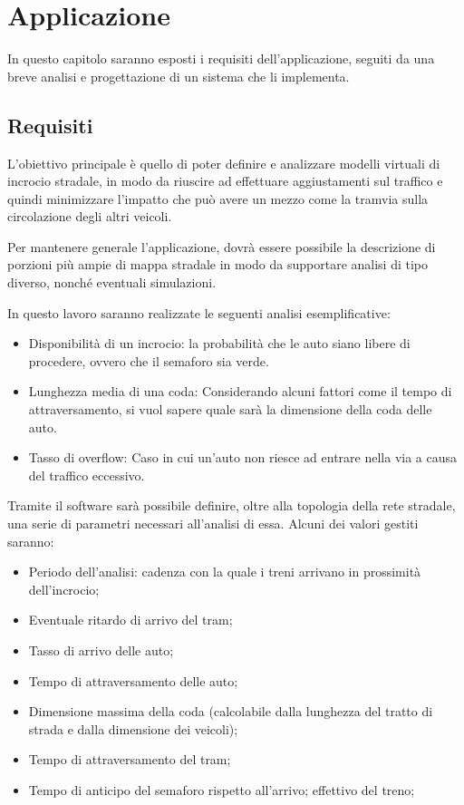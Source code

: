 \chapter{Applicazione}

In questo capitolo saranno esposti i requisiti dell'applicazione, seguiti da una breve analisi e progettazione di un sistema che li implementa.

\section{Requisiti}
L'obiettivo principale è quello di poter definire e analizzare modelli virtuali di incrocio stradale, in modo da riuscire ad effettuare aggiustamenti sul traffico e quindi minimizzare l'impatto che può avere un mezzo come la tramvia sulla circolazione degli altri veicoli.

Per mantenere generale l'applicazione, dovrà essere possibile la descrizione di porzioni più ampie di mappa stradale in modo da supportare analisi di tipo diverso, nonché eventuali simulazioni.

In questo lavoro saranno realizzate le seguenti analisi esemplificative:
\begin{itemize}
	\item Disponibilità di un incrocio: la probabilità che le auto siano libere di procedere, ovvero che il semaforo sia verde.
	\item Lunghezza media di una coda: Considerando alcuni fattori come il tempo di attraversamento, si vuol sapere quale sarà la dimensione della coda delle auto.
	\item Tasso di overflow: Caso in cui un'auto non riesce ad entrare nella via a causa del traffico eccessivo.
\end{itemize}

Tramite il software sarà possibile definire, oltre alla topologia della rete stradale, una serie di parametri necessari all'analisi di essa.
Alcuni dei valori gestiti saranno:
\begin{itemize}
	\item Periodo dell'analisi: cadenza con la quale i treni arrivano in prossimità dell'incrocio;
	\item Eventuale ritardo di arrivo del tram;
	\item Tasso di arrivo delle auto;
	\item Tempo di attraversamento delle auto;
	\item Dimensione massima della coda (calcolabile dalla lunghezza del tratto di strada e dalla dimensione dei veicoli);
	\item Tempo di attraversamento del tram;
	\item Tempo di anticipo del semaforo rispetto all'arrivo; effettivo del treno;
\end{itemize}

